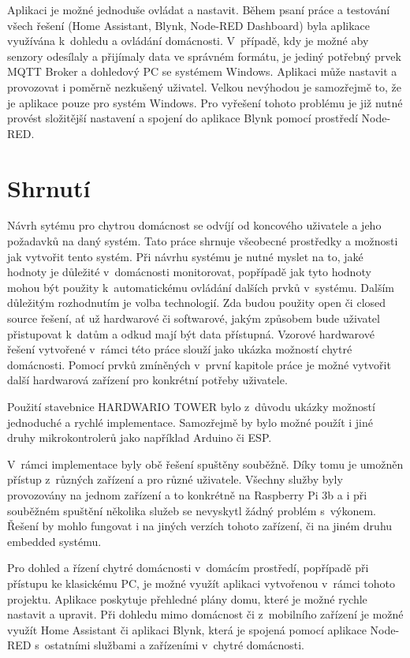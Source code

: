 Aplikaci je možné jednoduše ovládat a nastavit. Během psaní práce a testování všech řešení (Home Assistant, Blynk, Node-RED Dashboard) byla aplikace využívána k~dohledu a ovládání domácnosti. V~případě, kdy je možné aby senzory odesílaly a přijímaly data ve správném formátu, je jediný potřebný prvek MQTT Broker a dohledový PC se systémem Windows.
Aplikaci může nastavit a provozovat i poměrně nezkušený uživatel.
Velkou nevýhodou je samozřejmě to, že je aplikace pouze pro systém Windows. Pro vyřešení tohoto problému je již nutné provést složitější nastavení a spojení do aplikace Blynk pomocí prostředí Node-RED.

\section{Shrnutí}
Návrh sytému pro chytrou domácnost se odvíjí od koncového uživatele a jeho požadavků na daný systém. Tato práce shrnuje všeobecné prostředky a možnosti jak vytvořit tento systém. 
Při návrhu systému je nutné myslet na to, jaké hodnoty je důležité v~domácnosti monitorovat, popřípadě jak tyto hodnoty mohou být použity k~automatickému ovládání dalších prvků v~systému. Dalším důležitým rozhodnutím je volba technologií. Zda budou použity open či closed source řešení, ať už hardwarové či softwarové, jakým způsobem bude uživatel přistupovat k~datům a odkud mají být data přístupná.
Vzorové hardwarové řešení vytvořené v~rámci této práce slouží jako ukázka možností chytré domácnosti. Pomocí prvků zmíněných v~první kapitole práce je možné vytvořit další hardwarová zařízení pro konkrétní potřeby uživatele. 

Použití stavebnice HARDWARIO TOWER bylo z~důvodu ukázky možností jednoduché a rychlé implementace. Samozřejmě by bylo možné použít i jiné druhy mikrokontrolerů jako například Arduino či ESP.

V~rámci implementace byly obě řešení spuštěny souběžně. 
Díky tomu je umožněn přístup z~různých zařízení a pro různé uživatele. Všechny služby byly provozovány na jednom zařízení a to konkrétně na Raspberry Pi 3b a i při souběžném spuštění několika služeb se nevyskytl žádný problém s~výkonem. Řešení by mohlo fungovat i na jiných verzích tohoto zařízení, či na jiném druhu embedded systému. 

Pro dohled a řízení chytré domácnosti v~domácím prostředí, popřípadě při přístupu ke klasickému PC, je možné využít aplikaci vytvořenou v~rámci tohoto projektu. Aplikace poskytuje přehledné plány domu, které je možné rychle nastavit a upravit. 
Při dohledu mimo domácnost či z~mobilního zařízení je možné využít Home Assistant či aplikaci Blynk, která je spojená pomocí aplikace Node-RED s~ostatními službami a zařízeními v~chytré domácnosti.


